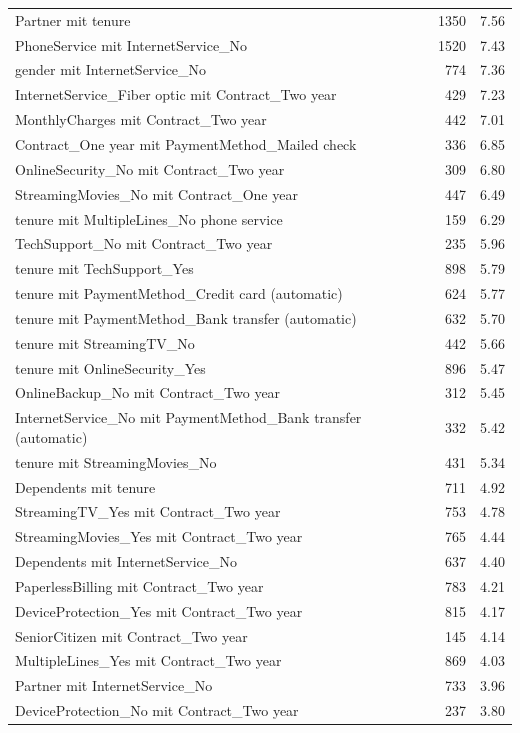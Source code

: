 \documentclass[a4paper,11pt]{article}
\begin{document}
\begin{longtable}{p{9cm}rr}
Partner mit tenure & 1350 & 7.56 \\
PhoneService mit InternetService\_No & 1520 & 7.43 \\
gender mit InternetService\_No & 774 & 7.36 \\
InternetService\_Fiber optic mit Contract\_Two year & 429 & 7.23 \\
MonthlyCharges mit Contract\_Two year & 442 & 7.01 \\
Contract\_One year mit PaymentMethod\_Mailed check & 336 & 6.85 \\
OnlineSecurity\_No mit Contract\_Two year & 309 & 6.80 \\
StreamingMovies\_No mit Contract\_One year & 447 & 6.49 \\
tenure mit MultipleLines\_No phone service & 159 & 6.29 \\
TechSupport\_No mit Contract\_Two year & 235 & 5.96 \\
tenure mit TechSupport\_Yes & 898 & 5.79 \\
tenure mit PaymentMethod\_Credit card (automatic) & 624 & 5.77 \\
tenure mit PaymentMethod\_Bank transfer (automatic) & 632 & 5.70 \\
tenure mit StreamingTV\_No & 442 & 5.66 \\
tenure mit OnlineSecurity\_Yes & 896 & 5.47 \\
OnlineBackup\_No mit Contract\_Two year & 312 & 5.45 \\
InternetService\_No mit PaymentMethod\_Bank transfer (automatic) & 332 & 5.42 \\
tenure mit StreamingMovies\_No & 431 & 5.34 \\
Dependents mit tenure & 711 & 4.92 \\
StreamingTV\_Yes mit Contract\_Two year & 753 & 4.78 \\
StreamingMovies\_Yes mit Contract\_Two year & 765 & 4.44 \\
Dependents mit InternetService\_No & 637 & 4.40 \\
PaperlessBilling mit Contract\_Two year & 783 & 4.21 \\
DeviceProtection\_Yes mit Contract\_Two year & 815 & 4.17 \\
SeniorCitizen mit Contract\_Two year & 145 & 4.14 \\
MultipleLines\_Yes mit Contract\_Two year & 869 & 4.03 \\
Partner mit InternetService\_No & 733 & 3.96 \\
DeviceProtection\_No mit Contract\_Two year & 237 & 3.80 \\

\end{longtable}
\end{document}
